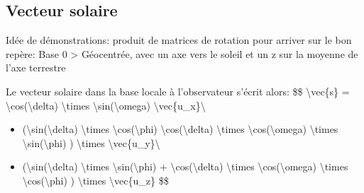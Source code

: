 \documentclass[letterpaper,10pt,english]{sphinxmanual}
\begin{document}
\noindent{}


\subsection{Vecteur solaire}
\label{\detokenize{Part3/EmplacementSoleil:id1}}
Idée de démonstrations: produit de matrices de rotation pour arriver sur le bon repère: Base 0 \sphinxhyphen{}> Géocentrée, avec un axe vers le soleil et un z sur la moyenne de l’axe terrestre

Le vecteur solaire dans la base locale à l’observateur s’écrit alors:
\$\$
\textbackslash{}vec\{s\} = \sphinxhyphen{} \textbackslash{}cos(\textbackslash{}delta) \textbackslash{}times \textbackslash{}sin(\textbackslash{}omega) \textbackslash{}vec\{u\_x\}\textbackslash{}
\begin{itemize}
\item {} 
(\textbackslash{}sin(\textbackslash{}delta) \textbackslash{}times \textbackslash{}cos(\textbackslash{}phi) \sphinxhyphen{} \textbackslash{}cos(\textbackslash{}delta) \textbackslash{}times \textbackslash{}cos(\textbackslash{}omega) \textbackslash{}times \textbackslash{}sin(\textbackslash{}phi) ) \textbackslash{}times \textbackslash{}vec\{u\_y\}\textbackslash{}

\item {} 
(\textbackslash{}sin(\textbackslash{}delta) \textbackslash{}times \textbackslash{}sin(\textbackslash{}phi) + \textbackslash{}cos(\textbackslash{}delta) \textbackslash{}times \textbackslash{}cos(\textbackslash{}omega) \textbackslash{}times \textbackslash{}cos(\textbackslash{}phi) ) \textbackslash{}times \textbackslash{}vec\{u\_z\}
\$\$

\end{itemize}

\begin{sphinxVerbatim}[commandchars=\\\{\}]
 
        
              
              
     
\end{sphinxVerbatim}
\end{document}

